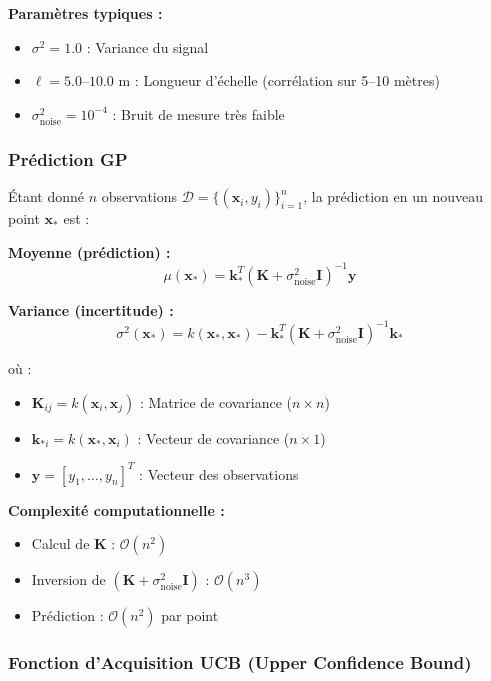 \documentclass[12pt,a4paper]{article}
\newcommand{\gp}{\textsc{GP}}
\begin{document}
\textbf{Paramètres typiques :}
\begin{itemize}
    \item $\sigma^2 = 1.0$ : Variance du signal
    \item $\ell = 5.0$--$10.0$ m : Longueur d'échelle (corrélation sur 5--10 mètres)
    \item $\sigma^2_{\text{noise}} = 10^{-4}$ : Bruit de mesure très faible
\end{itemize}

\subsubsection{Prédiction \gp{}}

Étant donné $n$ observations $\mathcal{D} = \{(\mathbf{x}_i, y_i)\}_{i=1}^n$, la prédiction en un nouveau point $\mathbf{x}_*$ est :

\textbf{Moyenne (prédiction) :}
\begin{equation}
\mu(\mathbf{x}_*) = \mathbf{k}_*^T (\mathbf{K} + \sigma^2_{\text{noise}} \mathbf{I})^{-1} \mathbf{y}
\end{equation}

\textbf{Variance (incertitude) :}
\begin{equation}
\sigma^2(\mathbf{x}_*) = k(\mathbf{x}_*, \mathbf{x}_*) - \mathbf{k}_*^T (\mathbf{K} + \sigma^2_{\text{noise}} \mathbf{I})^{-1} \mathbf{k}_*
\end{equation}

où :
\begin{itemize}
    \item $\mathbf{K}_{ij} = k(\mathbf{x}_i, \mathbf{x}_j)$ : Matrice de covariance ($n \times n$)
    \item $\mathbf{k}_{*i} = k(\mathbf{x}_*, \mathbf{x}_i)$ : Vecteur de covariance ($n \times 1$)
    \item $\mathbf{y} = [y_1, \ldots, y_n]^T$ : Vecteur des observations
\end{itemize}

\textbf{Complexité computationnelle :}
\begin{itemize}
    \item Calcul de $\mathbf{K}$ : $\mathcal{O}(n^2)$
    \item Inversion de $(\mathbf{K} + \sigma^2_{\text{noise}} \mathbf{I})$ : $\mathcal{O}(n^3)$
    \item Prédiction : $\mathcal{O}(n^2)$ par point
\end{itemize}

\subsubsection{Fonction d'Acquisition UCB (Upper Confidence Bound)}
\end{document}
